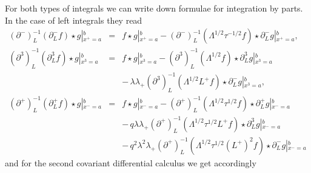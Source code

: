 \documentclass[a4paper,11pt,oneside]{article}
\begin{document}
For both types of integrals we can write down formulae for integration by
parts. In the case of left integrals they read 
\begin{eqnarray}
\left( \partial ^{-}\right) _{L}^{-1}\left( \partial _{L}^{-}f\right) \star
g\left| _{x^{+}=a}^{b}\right. &=&f\star g\left| _{x^{+}=a}^{b}\right.
-\left( \partial ^{-}\right) _{L}^{-1}\left( \Lambda ^{1/2}\tau
^{-1/2}f\right) \star \partial _{L}^{-}g\left| _{x^{+}=a}^{b},\right. \\
\left( \partial ^{3}\right) _{L}^{-1}\left( \partial _{L}^{3}f\right) \star
g\left| _{x^{3}=a}^{b}\right. &=&f\star g\left| _{x^{3}=a}^{b}\right.
-\left( \partial ^{3}\right) _{L}^{-1}\left( \Lambda ^{1/2}f\right) \star
\partial _{L}^{3}g\left| _{x^{3}=a}^{b}\right.  \nonumber \\
&&-\,\lambda \lambda _{+}\left( \partial ^{3}\right) _{L}^{-1}\left( \Lambda
^{1/2}L^{+}f\right) \star \partial _{L}^{-}g\left| _{x^{3}=a}^{b}\right. , 
\nonumber \\
\left( \partial ^{+}\right) _{L}^{-1}\left( \partial _{L}^{+}f\right) \star
g\left| _{x^{-}=a}^{b}\right. &=&f\star g\left| _{x^{-}=a}^{b}\right.
-\left( \partial ^{+}\right) _{L}^{-1}\left( \Lambda ^{1/2}\tau
^{1/2}f\right) \star \partial _{L}^{+}g\left| _{x^{-}=a}^{b}\right. 
\nonumber \\
&&-\,q\lambda \lambda _{+}\left( \partial ^{+}\right) _{L}^{-1}\left(
\Lambda ^{1/2}\tau ^{1/2}L^{+}f\right) \star \partial _{L}^{3}g\left|
_{x^{-}=a}^{b}\right.  \nonumber \\
&&-\,q^{2}\lambda ^{2}\lambda _{+}\left( \partial ^{+}\right)
_{L}^{-1}\left( \Lambda ^{1/2}\tau ^{1/2}\left( L^{+}\right) ^{2}f\right)
\star \partial _{L}^{-}g\left| _{x^{-}=a}^{b}\right.  \nonumber
\end{eqnarray}
and for the second covariant differential calculus we get accordingly 
\end{document}
